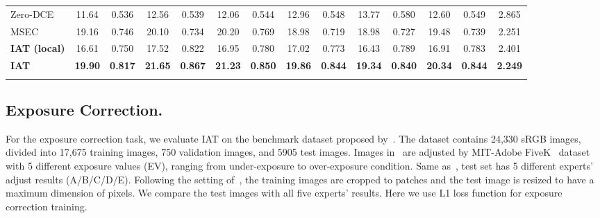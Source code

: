 \documentclass{bmvc2k}
\begin{document}
\begin{table}[t]
\begin{adjustbox}{max width = 1\linewidth}
\begin{tabular}{l|cc|cc|cc|cc|cc|cc|c}
Zero-DCE~\cite{zero_dce}                & 11.64         & 0.536         & 12.56         & 0.539         & 12.06         & 0.544         & 12.96         & 0.548         & 13.77 & 0.580 & 12.60       & 0.549      & 2.865               \\ 
MSEC~\cite{Exposure_2021_CVPR}                    & 19.16         & 0.746         & 20.10         & 0.734         & 20.20         & 0.769         & 18.98         & 0.719         & 18.98 & 0.727 & 19.48       & 0.739      & 2.251              \\ 
\Xhline{0.6pt}
\textbf{IAT (local) }            &     16.61    &      0.750   &    17.52    &  0.822  &  16.95  &  0.780  &  17.02  &  0.773  & 16.43  & 0.789  & 16.91 &  0.783  &   2.401           \\ 
\textbf{IAT}                     & \textbf{19.90 }        & \textbf{0.817}         & \textbf{21.65 }        & \textbf{0.867}         & \textbf{21.23}         & \textbf{0.850}  & \textbf{19.86}   & \textbf{0.844}    & \textbf{19.34} & \textbf{0.840} & \textbf{20.34}       & \textbf{0.844}      & \textbf{2.249}               \\ 
\Xhline{1.0pt}
\end{tabular}
\end{adjustbox}
\label{tab:Exposure}
\end{table}

\vspace{-3mm}
\subsection{Exposure Correction.}
\label{exp:exposure_correction}
For the  exposure correction task, we evaluate IAT on the benchmark dataset proposed by~\cite{Exposure_2021_CVPR}. The dataset contains 24,330 sRGB images, divided into 17,675 training images, 750 validation images, and 5905 test images. Images in~\cite{Exposure_2021_CVPR} are adjusted by MIT-Adobe FiveK~\cite{fivek_dataset} dataset with 5 different exposure values (EV), ranging from under-exposure to over-exposure condition. Same as~\cite{fivek_dataset}, test set has 5 different experts' adjust results (A/B/C/D/E). Following the setting of~\cite{Exposure_2021_CVPR}, the training images are cropped to  patches and the test image is resized to have a maximum dimension of  pixels. We compare the test images with all five experts' results. Here we use L1 loss function for exposure correction training. 
\end{document}
